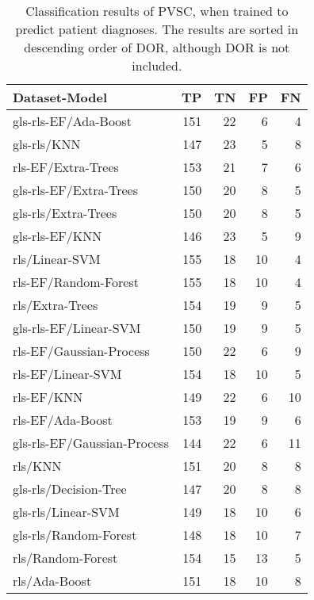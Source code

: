 \begin{longtable}{lrrrr}
    \caption{Classification results of PVSC, when trained to predict patient diagnoses.
             The results are sorted in descending order of DOR, although DOR is not included.}
    \label{tab:pvsc_ind_raw_results}\\
    \hline
    Dataset-Model &     TP &    TN &    FP &    FN \\
    \hline
    gls-rls-EF/Ada-Boost             &  151 &  22 &   6 &   4 \\
    gls-rls/KNN                      &  147 &  23 &   5 &   8 \\
    rls-EF/Extra-Trees               &  153 &  21 &   7 &   6 \\
    gls-rls-EF/Extra-Trees           &  150 &  20 &   8 &   5 \\
    gls-rls/Extra-Trees              &  150 &  20 &   8 &   5 \\
    gls-rls-EF/KNN                   &  146 &  23 &   5 &   9 \\
    rls/Linear-SVM                   &  155 &  18 &  10 &   4 \\
    rls-EF/Random-Forest             &  155 &  18 &  10 &   4 \\
    rls/Extra-Trees                  &  154 &  19 &   9 &   5 \\
    gls-rls-EF/Linear-SVM            &  150 &  19 &   9 &   5 \\
    rls-EF/Gaussian-Process          &  150 &  22 &   6 &   9 \\
    rls-EF/Linear-SVM                &  154 &  18 &  10 &   5 \\
    rls-EF/KNN                       &  149 &  22 &   6 &  10 \\
    rls-EF/Ada-Boost                 &  153 &  19 &   9 &   6 \\
    gls-rls-EF/Gaussian-Process      &  144 &  22 &   6 &  11 \\
    rls/KNN                          &  151 &  20 &   8 &   8 \\
    gls-rls/Decision-Tree            &  147 &  20 &   8 &   8 \\
    gls-rls/Linear-SVM               &  149 &  18 &  10 &   6 \\
    gls-rls/Random-Forest            &  148 &  18 &  10 &   7 \\
    rls/Random-Forest                &  154 &  15 &  13 &   5 \\
    rls/Ada-Boost                    &  151 &  18 &  10 &   8 \\

\end{longtable}
